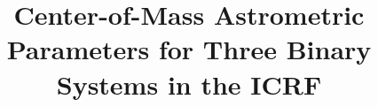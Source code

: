 \documentclass[linenumbers,trackchanges]{aastex701}
\begin{document}
\title{Center-of-Mass Astrometric Parameters for Three Binary Systems in the ICRF}

\end{document}
